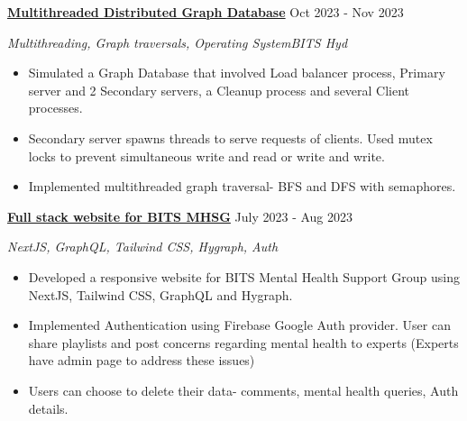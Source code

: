 \documentclass[a4paper,12pt]{report}
\begin{document}
\noindent
\textbf{\href{https://github.com/sumansekharsahoo/Multithreaded-GraphDB}{\color{black}Multithreaded Distributed Graph Database}} \hfill  {\fontsize{12pt}{12pt}\selectfont Oct 2023 - Nov 2023} \par
\par
\noindent 
{\fontsize{12pt}{12pt}\selectfont \textit{Multithreading, Graph traversals, Operating System}\hfill\textit{BITS Hyd}} \par
\noindent 
\begin{itemize}[noitemsep,topsep=0pt]
    \item {\fontsize{12pt}{12pt}\selectfont Simulated a Graph Database that involved Load balancer process, Primary server and 2 Secondary servers, a Cleanup process and several Client processes.} \par
    \item {\fontsize{12pt}{12pt}\selectfont Secondary server spawns threads to serve requests of clients. Used mutex locks to prevent simultaneous write and read or write and write.} \par
    \item {\fontsize{12pt}{12pt}\selectfont Implemented multithreaded graph traversal- BFS and DFS  with semaphores.} \par
\end{itemize}

\noindent 
\textbf{\href{https://github.com/sumansekharsahoo/bits-mhsg-next}{\color{black}Full stack website for BITS MHSG}} \hfill  {\fontsize{12pt}{12pt}\selectfont July 2023 - Aug 2023} \par
\noindent
{\fontsize{12pt}{12pt}\selectfont \textit{NextJS, GraphQL, Tailwind CSS,  Hygraph, Auth}} \par
\noindent 
\begin{itemize}[noitemsep,topsep=0pt]
    \item {\fontsize{12pt}{12pt}\selectfont Developed a responsive website for BITS Mental Health Support Group using NextJS, Tailwind CSS, GraphQL and Hygraph.}  \par
    \item {\fontsize{12pt}{12pt}\selectfont Implemented Authentication using Firebase Google Auth provider. User can share playlists and post concerns regarding mental health to experts (Experts have admin page to address these issues)}  \par
    \item {\fontsize{12pt}{12pt}\selectfont Users can choose to delete their data- comments, mental health queries, Auth details.}  \par
\end{itemize}
\end{document}
